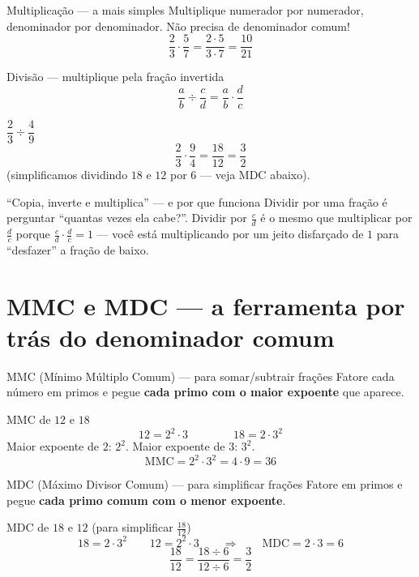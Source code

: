 \documentclass[12pt,a4paper]{article}
\begin{document}
\begin{definicao}{Multiplicação — a mais simples}
Multiplique numerador por numerador, denominador por denominador. Não
precisa de denominador comum!
\[
\frac{2}{3}\cdot\frac{5}{7} = \frac{2\cdot5}{3\cdot7} = \frac{10}{21}
\]
\end{definicao}

\begin{definicao}{Divisão — multiplique pela fração invertida}
\[
\frac{a}{b}\div\frac{c}{d} = \frac{a}{b}\cdot\frac{d}{c}
\]
\end{definicao}

\begin{exemplo}{$\dfrac{2}{3}\div\dfrac{4}{9}$}
\[
\frac{2}{3}\cdot\frac{9}{4} = \frac{18}{12} = \frac{3}{2}
\]
(simplificamos dividindo $18$ e $12$ por $6$ — veja MDC abaixo).
\end{exemplo}

\begin{macete}{``Copia, inverte e multiplica'' — e por que funciona}
Dividir por uma fração é perguntar ``quantas vezes ela cabe?''. Dividir por
$\frac{c}{d}$ é o mesmo que multiplicar por $\frac{d}{c}$ porque
$\frac{c}{d}\cdot\frac{d}{c}=1$ — você está multiplicando por um jeito
disfarçado de $1$ para ``desfazer'' a fração de baixo.
\end{macete}

\section{MMC e MDC — a ferramenta por trás do denominador comum}

\begin{definicao}{MMC (Mínimo Múltiplo Comum) — para somar/subtrair frações}
Fatore cada número em primos e pegue \textbf{cada primo com o maior expoente} que aparece.
\end{definicao}

\begin{exemplo}{MMC de $12$ e $18$}
\[
12 = 2^2\cdot3 \qquad\qquad 18=2\cdot3^2
\]
Maior expoente de $2$: $2^2$. Maior expoente de $3$: $3^2$.
\[
\text{MMC} = 2^2\cdot3^2 = 4\cdot9=36
\]
\end{exemplo}

\begin{definicao}{MDC (Máximo Divisor Comum) — para simplificar frações}
Fatore em primos e pegue \textbf{cada primo comum com o menor expoente}.
\end{definicao}

\begin{exemplo}{MDC de $18$ e $12$ (para simplificar $\frac{18}{12}$)}
\[
18=2\cdot3^2 \qquad 12=2^2\cdot3 \qquad\Rightarrow\qquad \text{MDC}=2\cdot3=6
\]
\[
\frac{18}{12} = \frac{18\div6}{12\div6} = \frac{3}{2}
\]
\end{exemplo}
\end{document}
